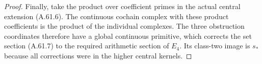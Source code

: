 \begin{proof}
Finally, take the product over coefficient primes
in the actual central extension (A.61.6).
The continuous cochain complex with these product
coefficients is the product of the individual
complexes.  The three obstruction coordinates
therefore have a global continuous primitive,
which corrects the set section (A.61.7) to the
required arithmetic section of $E_4$.
Its class-two image is $s_*$ because all corrections
were in the higher central kernels.
\end{proof}

